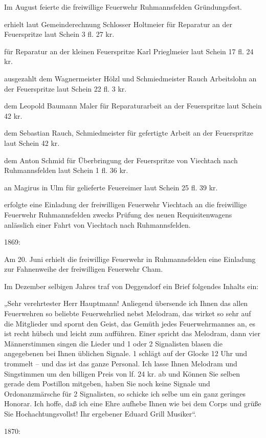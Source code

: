 \documentclass[12pt,a4pager]{book}
\begin{document}
Im August feierte die freiwillige Feuerwehr Ruhmannsfelden Gründungsfest.

erhielt laut Gemeinderechnung Schlosser Holtmeier für Reparatur an der
Feuerspritze laut Schein 3 fl. 27 kr.

für Reparatur an der kleinen Feuerspritze Karl Prieglmeier laut Schein 17 fl. 24
kr.

ausgezahlt dem Wagnermeister Hölzl und Schmiedmeister Rauch Arbeitslohn an der
Feuerspritze laut Schein 22 fl. 3 kr.

dem Leopold Baumann Maler für Reparaturarbeit an der Feuerspritze laut Schein 42
kr.

dem Sebastian Rauch, Schmiedmeister für gefertigte Arbeit an der Feuerspritze
laut Schein 42 kr.

dem Anton Schmid für Überbringung der Feuerspritze von Viechtach nach
Ruhmannsfelden laut Schein 1 fl. 36 kr.

an Magirus in Ulm für gelieferte Feuereimer laut Schein 25 fl. 39 kr.

erfolgte eine Einladung der freiwilligen Feuerwehr Viechtach an die freiwillige
Feuerwehr Ruhmannsfelden zwecks Prüfung des neuen Requisitenwagens anlässlich
einer Fahrt von Viechtach nach Ruhmannsfelden.

1869:

Am 20. Juni erhielt die freiwillige Feuerwehr in Ruhmannsfelden eine Einladung
zur Fahnenweihe der freiwilligen Feuerwehr Cham.

Im Dezember selbigen Jahres traf von Deggendorf ein Brief folgendes Inhalts ein:

„Sehr verehrtester Herr Hauptmann! Anliegend übersende ich Ihnen das allen
Feuerwehren so beliebte Feuerwehrlied nebst Melodram, das wirket so sehr auf die
Mitglieder und spornt den Geist, das Gemüth jedes Feuerwehrmannes an, es ist
recht hübsch und leicht zum aufführen. Einer spricht das Melodram, dann vier
Männerstimmen singen die Lieder und 1 oder 2 Signalisten blasen die angegebenen
bei Ihnen üblichen Signale. 1 schlägt auf der Glocke 12 Uhr und trommelt – und
das ist das ganze Personal. Ich lasse Ihnen Melodram und Singstimmen um den
billigen Preis von lf. 24 kr. ab und Können Sie selben gerade dem Postillon
mitgeben, haben Sie noch keine Signale und Ordonanzmärsche für 2 Signalisten, so
schicke ich selbe um ein ganz geringes Honorar. Ich hoffe, daß ich eine Ehre
aufhebe Ihnen wie bei dem Corps und grüße Sie Hochachtungsvollst! Ihr ergebener
Eduard Grill Musiker“.

1870:
\end{document}
